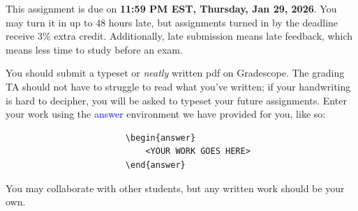 \documentclass[11pt]{article}
\newcommand{\bl}[1]{\textcolor{blue}{#1}}
\begin{document}

This assignment is due on \textbf{11:59 PM EST, Thursday, Jan 29, 2026}. You may turn it in up to 48 hours late, but assignments turned in by the deadline receive 3\% extra credit.  Additionally, late submission means late feedback, which means less time to study before an exam.

You should submit a typeset or \emph{neatly} written pdf on Gradescope. The grading TA should not have to struggle to read what you've written; if your handwriting is hard to decipher, you will be asked to typeset your future assignments. Enter your work using the \bl{answer} environment we have provided for you, like so:
\begin{verbatim}
                        \begin{answer}
                            <YOUR WORK GOES HERE> 
                        \end{answer}
\end{verbatim}

You may collaborate with other students, but any written work should be your own. 
\end{document}
